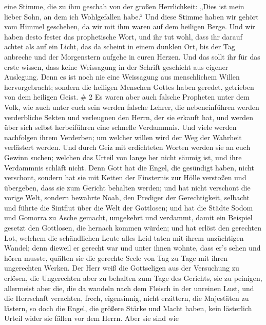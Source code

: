 eine Stimme, die zu ihm geschah von der großen Herrlichkeit: „Dies ist
mein lieber Sohn, an dem ich Wohlgefallen habe.``  Und
diese Stimme haben wir gehört vom Himmel geschehen, da wir mit ihm waren
auf dem heiligen Berge.  Und wir haben desto fester das
prophetische Wort, und ihr tut wohl, dass ihr darauf achtet als auf ein
Licht, das da scheint in einem dunklen Ort, bis der Tag anbreche und der
Morgenstern aufgehe in euren Herzen.  Und das sollt ihr für
das erste wissen, dass keine Weissagung in der Schrift geschieht aus
eigener Auslegung.  Denn es ist noch nie eine Weissagung
aus menschlichem Willen hervorgebracht; sondern die heiligen Menschen
Gottes haben geredet, getrieben von dem heiligen Geist. \# 2
 Es waren aber auch falsche Propheten unter dem Volk, wie
auch unter euch sein werden falsche Lehrer, die nebeneinführen werden
verderbliche Sekten und verleugnen den Herrn, der sie erkauft hat, und
werden über sich selbst herbeiführen eine schnelle Verdammnis.
 Und viele werden nachfolgen ihrem Verderben; um welcher
willen wird der Weg der Wahrheit verlästert werden.  Und
durch Geiz mit erdichteten Worten werden sie an euch Gewinn suchen;
welchen das Urteil von lange her nicht säumig ist, und ihre Verdammnis
schläft nicht.  Denn Gott hat die Engel, die gesündigt
haben, nicht verschont, sondern hat sie mit Ketten der Finsternis zur
Hölle verstoßen und übergeben, dass sie zum Gericht behalten werden;
 und hat nicht verschont die vorige Welt, sondern bewahrte
Noah, den Prediger der Gerechtigkeit, selbacht und führte die Sintflut
über die Welt der Gottlosen;  und hat die Städte Sodom und
Gomorra zu Asche gemacht, umgekehrt und verdammt, damit ein Beispiel
gesetzt den Gottlosen, die hernach kommen würden;  und hat
erlöst den gerechten Lot, welchem die schändlichen Leute alles Leid
taten mit ihrem unzüchtigen Wandel;  denn dieweil er gerecht
war und unter ihnen wohnte, dass er's sehen und hören musste, quälten
sie die gerechte Seele von Tag zu Tage mit ihren ungerechten Werken.
 Der Herr weiß die Gottseligen aus der Versuchung zu
erlösen, die Ungerechten aber zu behalten zum Tage des Gerichts, sie zu
peinigen,  allermeist aber die, die da wandeln nach dem
Fleisch in der unreinen Lust, und die Herrschaft verachten, frech,
eigensinnig, nicht erzittern, die Majestäten zu lästern, 
so doch die Engel, die größere Stärke und Macht haben, kein lästerlich
Urteil wider sie fällen vor dem Herrn.  Aber sie sind wie
